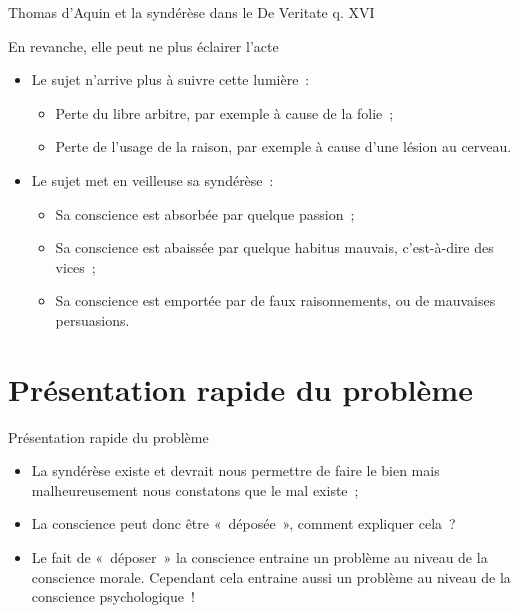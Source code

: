 \documentclass[11pt,xcolor=dvipsname,ignorenonframetext,handout]{beamer}
\begin{document}
\begin{frame}{Thomas d'Aquin et la syndérèse dans le De Veritate q. XVI}
    \begin{alertblock}{En revanche, elle peut ne plus éclairer l'acte}
        \begin{itemize}
            \rightskip=0pt\leftskip=0pt
            \item Le sujet n'arrive plus à suivre cette lumière~:
            \begin{itemize}
                \rightskip=0pt\leftskip=0pt
                \item Perte du libre arbitre, par exemple à cause de la folie~;
                \item Perte de l'usage de la raison, par exemple à cause d'une lésion au cerveau.
            \end{itemize}
            \item Le sujet met en veilleuse sa syndérèse~:
            \begin{itemize}
                \rightskip=0pt\leftskip=0pt
                \item Sa conscience est absorbée par quelque passion~;
                \item Sa conscience est abaissée par quelque habitus mauvais, c'est-à-dire des vices~;
                \item Sa conscience est emportée par de faux raisonnements, ou de mauvaises persuasions.
            \end{itemize}
        \end{itemize}
    \end{alertblock}
\end{frame}
\section{Présentation rapide du problème}
\begin{frame}{Présentation rapide du problème}
    \begin{itemize}
    \rightskip=0pt\leftskip=0pt
\item La syndérèse existe et devrait nous permettre de faire le bien mais
malheureusement nous constatons que le mal existe~;
        \item La conscience peut donc être «~déposée~», comment expliquer cela~?
\item Le fait de «~déposer~» la conscience entraine un problème au niveau de la
conscience morale. Cependant cela entraine aussi un problème au niveau de la
conscience psychologique~!
    \end{itemize}

\end{frame}
\end{document}
